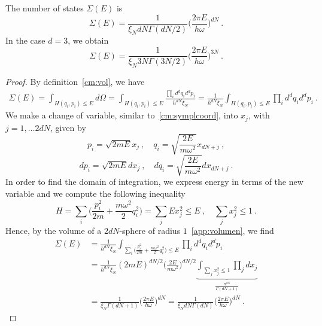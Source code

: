     The number of states $\Sigma(E)$ is 
    \begin{equation*}
        \Sigma(E) = \frac{1}{\xi_N d N \Gamma(dN/2)} \Big ( \frac{2 \pi E}{h \omega}\Big)^{dN} ~.
    \end{equation*}
    In the case $d = 3$, we obtain 
    \begin{equation*}
        \Sigma(E) = \frac{1}{\xi_N 3N \Gamma(3N/2)} \Big ( \frac{2 \pi E}{h \omega}\Big)^{3N} ~.
    \end{equation*}
    \begin{proof}
        By definition~\eqref{cm:vol}, we have
        \begin{equation*}
        \begin{aligned}
            \Sigma (E) = \int_{H (q_i, p_i) \leq E} d\Omega = \int_{H (q_i, p_i) \leq E} \frac{\prod_i d^d q_i d^d p_i}{h^{dN} \xi_N} = \frac{1}{h^{dN} \xi_N} \int_{H (q_i, p_i) \leq E} \prod_i d^d q_i d^d p_i ~.
        \end{aligned}
        \end{equation*}
        We make a change of variable, similar to~\eqref{cm:symplcoord}, into $x_j$, with $j = 1, \ldots 2dN$, given by
        \begin{equation*}
            p_i = \sqrt{2mE} x_j ~, \quad q_i = \sqrt{\frac{2E}{m\omega^2}} x_{dN + j} ~,
        \end{equation*}
        \begin{equation*}
            d p_i = \sqrt{2mE} dx_j  ~, \quad d q_i = \sqrt{\frac{2E}{m\omega^2}} d x_{dN + j} ~.
        \end{equation*}
        In order to find the domain of integration, we express energy in terms of the new variable and we compute the following inequality
        \begin{equation*}
            H = \sum_i \Big ( \frac{p^2_i}{2m} + \frac{m \omega^2}{2} q_i^2 \Big ) = \sum_j E x_j^2 \leq E ~, \quad \sum_j x^2_j \leq 1 ~.
        \end{equation*}
        Hence, by the volume of a $2dN$-sphere of radius $1$~\eqref{app:volumen}, we find
        \begin{equation*}
        \begin{aligned}
            \Sigma (E) & = \frac{1}{h^{dN} \xi_N} \int_{\sum_i \Big ( \frac{p^2_i}{2m} + \frac{m \omega^2}{2} q_i^2 \Big ) \leq E} \prod_i d^d q_i d^d p_i \\ & = \frac{1}{h^{dN} \xi_N} (2mE)^{dN/2} \Big (\frac{2E}{m\omega^2} \Big )^{dN/2} \underbrace{\int_{\sum_j x^2_j \leq 1} \prod_j d x_j}_{ \frac{\pi^{dN}}{\Gamma (dN + 1)}} \\ & = \frac{1}{\xi_N \Gamma (dN + 1)} \Big (\frac{2 \pi E}{h \omega} \Big )^{dN} = \frac{1}{\xi_N dN \Gamma (dN)} \Big (\frac{2 \pi E}{h \omega} \Big)^{dN} ~.
        \end{aligned}
        \end{equation*}
    \end{proof}
